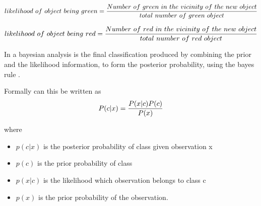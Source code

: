 \documentclass[10pt,a4paper]{article}
\begin{document}
\begin{equation}
\centering
likelihood~of~object~being~green = \frac{Number~of~green~in~the~vicinity~of~the~new~object }{total~number~of~green~object}
\end{equation}

\begin{equation}
\centering
likelihood~of~object~being~red = \frac{Number~of~red~in~the~vicinity~of~the~new~object }{total~number~of~red~object}
\end{equation}


In a bayesian analysis is the final classification produced by combining the prior and the likelihood information, to form the posterior probability, using the bayes rule . 


Formally can this be written as 
\begin{equation}
\centering
P(c|x) = \frac{P(x|c)P(c)}{P(x)}
\end{equation}

where 
\begin{itemize}
\item	$p(c|x)$ is the posterior probability of class given observation x
\item	$p(c)$ is the prior probability of class
\item   $p(x|c)$ is the likelihood which observation belongs to class  c
\item   $p(x)$ is the prior probability of the observation. 
\end{itemize}





 
\end{document}
